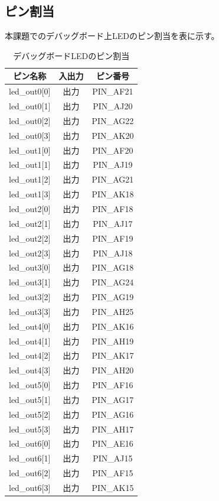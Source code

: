 \documentclass{ltjsarticle}
\begin{document}
	\subsection{ピン割当}
		本課題でのデバッグボード上LEDのピン割当を表に示す。
		\begin{table}[H]
		\begin{center}
		\caption{デバッグボードLEDのピン割当}
		\label{tab:LEDpin}
		\begin{tabular}{cc|c} \toprule
			ピン名称&入出力&ピン番号\\ \hline
			led\_out0[0]&出力&PIN\_AF21\\
			led\_out0[1]&出力&PIN\_AJ20\\
			led\_out0[2]&出力&PIN\_AG22\\
			led\_out0[3]&出力&PIN\_AK20\\
			led\_out1[0]&出力&PIN\_AF20\\
			led\_out1[1]&出力&PIN\_AJ19\\
			led\_out1[2]&出力&PIN\_AG21\\
			led\_out1[3]&出力&PIN\_AK18\\
			led\_out2[0]&出力&PIN\_AF18\\
			led\_out2[1]&出力&PIN\_AJ17\\
			led\_out2[2]&出力&PIN\_AF19\\
			led\_out2[3]&出力&PIN\_AJ18\\
			led\_out3[0]&出力&PIN\_AG18\\
			led\_out3[1]&出力&PIN\_AG24\\
			led\_out3[2]&出力&PIN\_AG19\\
			led\_out3[3]&出力&PIN\_AH25\\
			led\_out4[0]&出力&PIN\_AK16\\
			led\_out4[1]&出力&PIN\_AH19\\
			led\_out4[2]&出力&PIN\_AK17\\
			led\_out4[3]&出力&PIN\_AH20\\
			led\_out5[0]&出力&PIN\_AF16\\
			led\_out5[1]&出力&PIN\_AG17\\
			led\_out5[2]&出力&PIN\_AG16\\
			led\_out5[3]&出力&PIN\_AH17\\
			led\_out6[0]&出力&PIN\_AE16\\
			led\_out6[1]&出力&PIN\_AJ15\\
			led\_out6[2]&出力&PIN\_AF15\\
			led\_out6[3]&出力&PIN\_AK15\\

\end{tabular}
\end{center}
\end{table}
\end{document}
